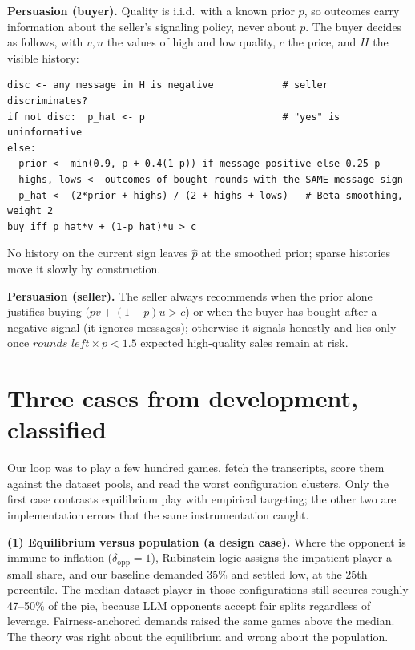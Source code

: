 \documentclass{article}
\begin{document}
\textbf{Persuasion (buyer).} Quality is i.i.d.\ with a known prior $p$, so
outcomes carry information about the seller's signaling policy, never about
$p$. The buyer decides as follows, with $v,u$ the values of high and low
quality, $c$ the price, and $H$ the visible history:
\begin{small}
\begin{verbatim}
disc <- any message in H is negative            # seller discriminates?
if not disc:  p_hat <- p                        # "yes" is uninformative
else:
  prior <- min(0.9, p + 0.4(1-p)) if message positive else 0.25 p
  highs, lows <- outcomes of bought rounds with the SAME message sign
  p_hat <- (2*prior + highs) / (2 + highs + lows)   # Beta smoothing, weight 2
buy iff p_hat*v + (1-p_hat)*u > c
\end{verbatim}
\end{small}
No history on the current sign leaves $\hat p$ at the smoothed prior; sparse
histories move it slowly by construction.

\textbf{Persuasion (seller).} The seller always recommends when the prior
alone justifies buying ($pv+(1-p)u>c$) or when the buyer has bought after a
negative signal (it ignores messages); otherwise it signals honestly and lies
only once $\textit{rounds left}\times p < 1.5$ expected high-quality sales
remain at risk.

\section{Three cases from development, classified}
\label{sec:cases}

Our loop was to play a few hundred games, fetch the transcripts, score them
against the dataset pools, and read the worst configuration clusters. Only the
first case contrasts equilibrium play with empirical targeting; the other two
are implementation errors that the same instrumentation caught.

\textbf{(1) Equilibrium versus population (a design case).} Where the opponent
is immune to inflation ($\delta_{\mathrm{opp}}{=}1$), Rubinstein logic assigns
the impatient player a small share, and our baseline demanded 35\% and settled
low, at the 25th percentile. The median dataset player in those configurations
still secures roughly 47--50\% of the pie, because LLM opponents accept fair
splits regardless of leverage. Fairness-anchored demands raised the same games
above the median. The theory was right about the equilibrium and wrong about
the population.
\end{document}
